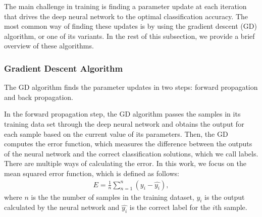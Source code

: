 \documentclass[letterpaper]{article}
\begin{document}
\begin{flushleft}
{%

The main challenge in training is finding a parameter update at each iteration that drives the deep neural network to the optimal
classification accuracy. The most common way of finding these updates is by using the gradient descent (GD) algorithm, or one of its
variants. In the rest of this subsection, we provide a brief overview of these algorithms. 


\subsubsection{Gradient Descent Algorithm}
The GD algorithm finds the parameter updates in two steps: forward propagation and back propagation. 

In the forward propagation step, the GD algorithm passes the samples in its training data set through the
deep neural network and obtains the output for each sample based on the current value of its parameters. Then, the GD computes the
error function, which measures the difference between the outputs of the neural network and the correct classification solutions,
which we call labels. There are multiple ways of calculating the error. In this work, we focus on the mean squared error function,
which is defined as follows:
\begin{align}\label{eq:errorFunction}
 E= \frac{1}{n} \sum_{n=1}^{n}(y_i -\hat{y_i}),
\end{align}
where $n$ is the the number of samples in the training dataset, $y_i$ is the output calculated by the neural network and 
$\hat{y_i}$ is the correct label for the $i$th sample.


}
\end{flushleft}
\end{document}
